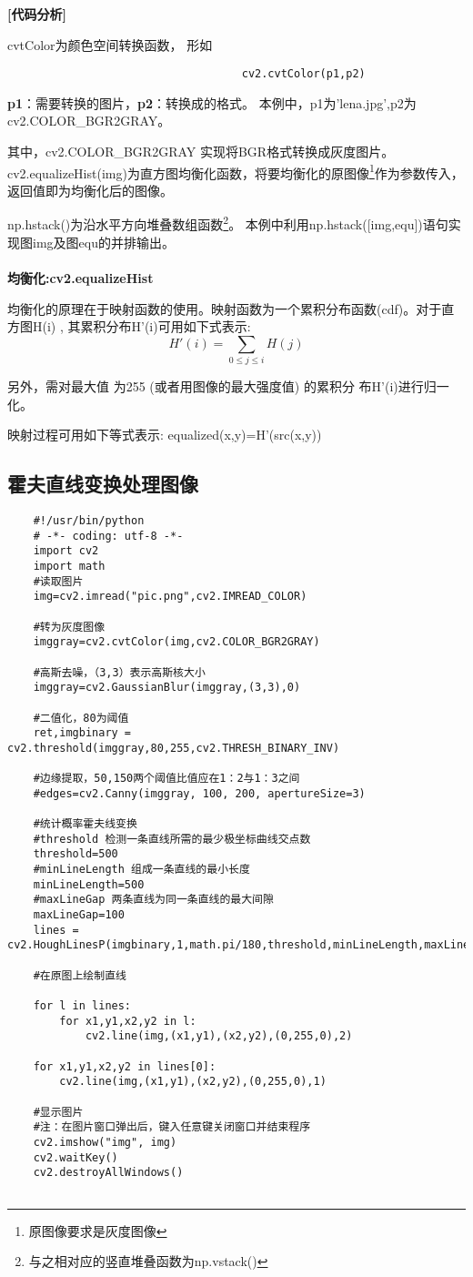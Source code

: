 \documentclass{article}
\begin{document}
\textbf{[代码分析]}

cvtColor为颜色空间转换函数，
形如
\begin{lstlisting}
                                    cv2.cvtColor(p1,p2)
\end{lstlisting}

\textbf{p1}：需要转换的图片，\textbf{p2}：转换成的格式。
本例中，p1为'lena.jpg',p2为cv2.COLOR\_BGR2GRAY。 

其中，cv2.COLOR\_BGR2GRAY 实现将BGR格式转换成灰度图片。
cv2.equalizeHist(img)为直方图均衡化函数，将要均衡化的原图像\footnote{原图像要求是灰度图像}作为参数传入，返回值即为均衡化后的图像。

np.hstack()为沿水平方向堆叠数组函数\footnote{与之相对应的竖直堆叠函数为np.vstack()}。
本例中利用np.hstack([img,equ])语句实现图img及图equ的并排输出。
\\\hsapce*{\fill}\\
\indent\textbf{均衡化:cv2.equalizeHist}

均衡化的原理在于映射函数的使用。映射函数为一个累积分布函数(cdf)。对于直方图H(i) , 其累积分布H'(i)可用如下式表示:
$$
H'(i)=\sum_{0\leqslant j \leq i}H(j)
$$

 另外，需对最大值
     为255 (或者用图像的最大强度值) 的累积分
     布H'(i)进行归一化。
     
     映射过程可用如下等式表示:
     equalized(x,y)=H'(src(x,y))


\subsection{霍夫直线变换处理图像}
\begin{lstlisting}
    #!/usr/bin/python
    # -*- coding: utf-8 -*- 
    import cv2
    import math
    #读取图片
    img=cv2.imread("pic.png",cv2.IMREAD_COLOR)
    
    #转为灰度图像
    imggray=cv2.cvtColor(img,cv2.COLOR_BGR2GRAY)
    
    #高斯去噪，（3,3）表示高斯核大小
    imggray=cv2.GaussianBlur(imggray,(3,3),0)
    
    #二值化，80为阈值
    ret,imgbinary = cv2.threshold(imggray,80,255,cv2.THRESH_BINARY_INV)
    
    #边缘提取，50,150两个阈值比值应在1：2与1：3之间
    #edges=cv2.Canny(imggray, 100, 200, apertureSize=3)
    
    #统计概率霍夫线变换
    #threshold 检测一条直线所需的最少极坐标曲线交点数
    threshold=500
    #minLineLength 组成一条直线的最小长度
    minLineLength=500
    #maxLineGap 两条直线为同一条直线的最大间隙
    maxLineGap=100
    lines = cv2.HoughLinesP(imgbinary,1,math.pi/180,threshold,minLineLength,maxLineGap)
    
    #在原图上绘制直线
    
    for l in lines:
    	for x1,y1,x2,y2 in l:
    		cv2.line(img,(x1,y1),(x2,y2),(0,255,0),2)
    
    for x1,y1,x2,y2 in lines[0]:
    	cv2.line(img,(x1,y1),(x2,y2),(0,255,0),1)
    
    #显示图片
    #注：在图片窗口弹出后，键入任意键关闭窗口并结束程序
    cv2.imshow("img", img)
    cv2.waitKey()
    cv2.destroyAllWindows()
   
\end{lstlisting}
\end{document}
